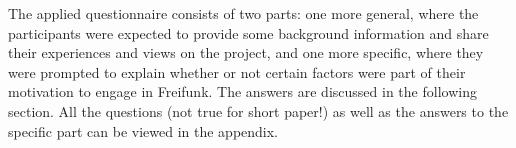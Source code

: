 The applied questionnaire consists of two parts: one more general, where the participants were expected to provide some background information and share their experiences and views on the project, and one more specific, where they were prompted to explain whether or not certain factors were part of their motivation to engage in Freifunk.
The answers are discussed in the following section.
All the questions (not true for short paper!) as well as the answers to the specific part can be viewed in the appendix.


\begin{comment}
\begin{itemize}
  \item literature review for FLOSS <-- only as comparison
  \item semi-structured interviews for Freifunk <-- focus
    \begin{itemize}
      \item limitations of the methodology
    \end{itemize}
\end{itemize}
\end{comment}
